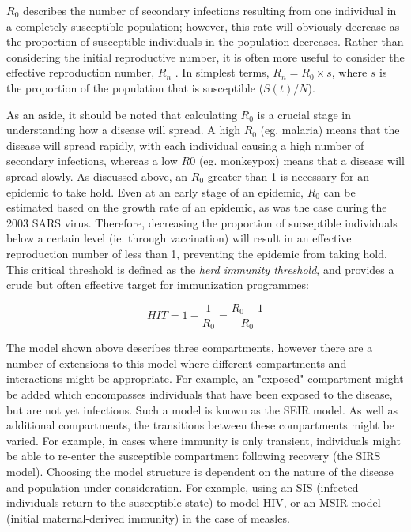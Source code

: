 $R_0$ describes the number of secondary infections resulting from one individual in a completely susceptible population; however, this rate will obviously decrease as the proportion of susceptible individuals in the population decreases. Rather than considering the initial reproductive number, it is often more useful to consider the effective reproduction number, $R_n$ . In simplest terms, $R_n = R_0 \times s$, where $s$ is the proportion of the population that is susceptible ($S(t)/N$).

As an aside, it should be noted that calculating $R_0$ is a crucial stage in understanding how a disease will spread. A high $R_0$ (eg. malaria) means that the disease will spread rapidly, with each individual causing a high number of secondary infections, whereas a low $R0$ (eg. monkeypox) means that a disease will spread slowly.\cite{vynnycky} As discussed above, an $R_0$ greater than 1 is necessary for an epidemic to take hold. Even at an early stage of an epidemic, $R_0$ can be estimated based on the growth rate of an epidemic, as was the case during the 2003 SARS virus.\cite{sars} Therefore, decreasing the proportion of sucseptible individuals below a certain level (ie. through vaccination) will result in an effective reproduction number of less than 1, preventing the epidemic from taking hold. This critical threshold is defined as the \emph{herd immunity threshold}, and provides a crude but often effective target for immunization programmes:\cite{cockman}

\begin{equation*}
HIT = 1 - \frac{1}{R_0} = \frac{R_0 -1}{R_0}
\end{equation*}

The model shown above describes three compartments, however there are a number of extensions to this model where different compartments and interactions might be appropriate. For example, an "exposed" compartment might be added which encompasses individuals that have been exposed to the disease, but are not yet infectious. Such a model is known as the SEIR model. As well as additional compartments, the transitions between these compartments might be varied. For example, in cases where immunity is only transient, individuals might be able to re-enter the susceptible compartment following recovery (the SIRS model). Choosing the model structure is dependent on the nature of the disease and population under consideration. For example, using an SIS (infected individuals return to the susceptible state) to model HIV, or an MSIR model (initial maternal-derived immunity) in the case of measles.\cite{vynnycky} 

